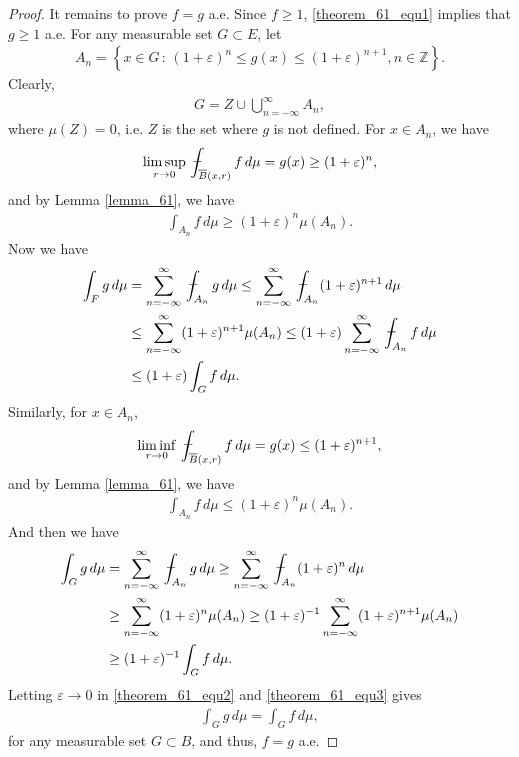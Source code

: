 \documentclass[11pt]{book}
\theoremstyle{definition}
\numberwithin{equation}{chapter}
\def\avint{\,\ThisStyle{\ensurestackMath{%
  \stackinset{c}{.2\LMpt}{c}{1\LMpt}{\SavedStyle-}{\SavedStyle\phantom{\int}}}%
  \setbox0=\hbox{$\SavedStyle\int\,$}\kern-\wd0}\int}
\begin{document}
\begin{proof}
It remains to prove $f = g$ a.e. Since $f \geq 1$, \eqref{theorem_61_equ1} implies that $g \geq 1$ a.e. For any measurable set $G \subset E$, let
\begin{align*}
    A_n = \left\{x \in G \,:\, (1 + \varepsilon)^n \leq g(x) \leq (1 + \varepsilon)^{n+1}, n \in \mathbb{Z}\right\}.
\end{align*}
Clearly, 
\begin{align*}
    G = Z \cup \bigcup^\infty_{n=-\infty} A_n,
\end{align*}
where $\mu(Z) = 0$, i.e. $Z$ is the set where $g$ is not defined. For $x \in A_n$, we have
\begin{align*}
    \limsup_{r\to 0} \avint_{\overline{B}(x,r)} f\,d\mu = g(x) \geq (1 + \varepsilon)^n,
\end{align*}
and by Lemma \ref{lemma_61}, we have
\begin{align*}
    \int_{A_n} f\,d\mu \geq (1 + \varepsilon)^n \mu(A_n).
\end{align*}
Now we have
\begin{align}
    \int_F g \,d\mu & = \sum^\infty_{n=-\infty} \avint_{A_n} g\,d\mu \leq \sum^\infty_{n=-\infty} \avint_{A_n} (1 + \varepsilon)^{n+1} \,d\mu \\
    & \leq \sum^\infty_{n=-\infty} (1 + \varepsilon)^{n+1} \mu(A_n) \leq (1 + \varepsilon) \sum^\infty_{n=-\infty} \avint_{A_n} f\,d\mu \\
    & \leq (1 + \varepsilon) \int_G f \,d\mu. \label{theorem_61_equ2}
\end{align}
Similarly, for $x \in A_n$,
\begin{align*}
    \liminf_{r\to 0} \avint_{\overline{B}(x,r)} f\,d\mu = g(x) \leq (1 + \varepsilon)^{n+1},
\end{align*}
and by Lemma \ref{lemma_61}, we have
\begin{align*}
    \int_{A_n} f\,d\mu \leq (1 + \varepsilon)^n \mu(A_n).
\end{align*}
And then we have
\begin{align}
    \int_G g \,d\mu & = \sum^\infty_{n=-\infty} \avint_{A_n} g\,d\mu \geq \sum^\infty_{n=-\infty} \avint_{A_n} (1 + \varepsilon)^n \,d\mu \\
    & \geq \sum^\infty_{n=-\infty} (1 + \varepsilon)^n \mu(A_n) \geq (1 + \varepsilon)^{-1} \sum^\infty_{n=-\infty} (1 + \varepsilon)^{n+1} \mu(A_n) \\
    & \geq (1 + \varepsilon)^{-1} \int_G f \,d\mu. \label{theorem_61_equ3}
\end{align}
Letting $\varepsilon \to 0$ in \eqref{theorem_61_equ2} and \eqref{theorem_61_equ3} gives
\begin{align*}
    \int_G g \,d\mu = \int_G f \,d\mu,
\end{align*}
for any measurable set $G \subset B$, and thus, $f = g$ a.e.
\end{proof}
\end{document}
